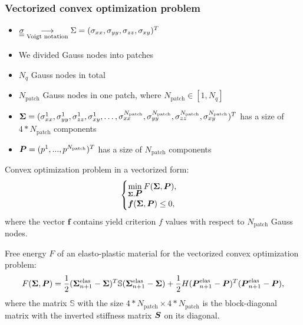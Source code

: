 \documentclass[9pt]{beamer}
\begin{document}
\begin{frame}
  \frametitle{Vectorized convex optimization problem}
  \begin{itemize}
    \item $\underline{\underline{\sigma}} \underset{\text{Voigt notation}}{\longrightarrow} \Sigma = (\sigma_{xx}, \sigma_{yy}, \sigma_{zz}, \sigma_{xy})^T$ 
    \item We divided Gauss nodes into patches
    \item $N_q$ Gauss nodes in total
    \item $N_\text{patch}$ Gauss nodes in one patch, where $N_\text{patch} \in [1, N_q]$
    \item $\bm{\Sigma} = (\sigma_{xx}^1, \sigma_{yy}^1, \sigma_{zz}^1, \sigma_{xy}^1, \dots, \sigma_{xx}^{N_\text{patch}}, \sigma_{yy}^{N_\text{patch}}, \sigma_{zz}^{N_\text{patch}}, \sigma_{xy}^{N_\text{patch}})^T$ has a size of $4*N_\text{patch}$ components
    \item $\mbox{\boldmath $P$} = (p^1, ..., p^{N_\text{patch}})^T$ has a size of $N_\text{patch}$ components
  \end{itemize}
  Convex optimization problem in a vectorized form:
  \begin{equation}
    \begin{cases}
        \min\limits_{\bm{\Sigma}, \mbox{\boldmath $P$}} F(\bm{\Sigma}, \mbox{\boldmath $P$}), \\
        \mbox{\boldmath $f$}(\bm{\Sigma}, \mbox{\boldmath $P$}) \leq 0,
    \end{cases}
  \end{equation}
  where the vector $\mathbold{f}$ contains yield criterion $f$ values with respect to $N_\text{patch}$ Gauss nodes. 

  Free energy $F$ of an elasto-plastic material for the vectorized convex optimization problem:
  \begin{equation}
    F(\bm{\Sigma}, \mbox{\boldmath $P$}) = \frac{1}{2}(\bm{\Sigma}_{n+1}^\text{elas} - \bm{\Sigma})^T \mathbb{S} (\bm{\Sigma}_{n+1}^\text{elas} - \bm{\Sigma}) + \frac{1}{2}H(\mbox{\boldmath $P$}_{n+1}^\text{elas} - \mbox{\boldmath $P$})^T(\mbox{\boldmath $P$}_{n+1}^\text{elas} - \mbox{\boldmath $P$}),
  \end{equation}
  where the matrix $\mathbb{S}$ with the size $4*N_\text{patch}\times4*N_\text{patch}$ is the block-diagonal matrix with the inverted stiffness matrix $\mbox{\boldmath $S$}$ on its diagonal.
\end{frame}
\end{document}
